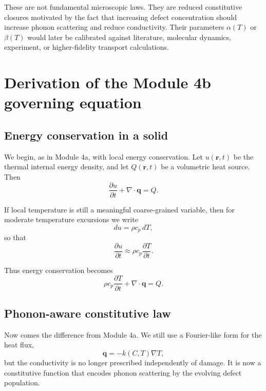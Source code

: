 \documentclass[11pt]{article}
\newcommand{\qvec}{\mathbf{q}}
\newcommand{\rvec}{\mathbf{r}}
\begin{document}
These are not fundamental microscopic laws. They are reduced constitutive closures motivated by the fact that increasing defect concentration should increase phonon scattering and reduce conductivity. Their parameters $\alpha(T)$ or $\beta(T)$ would later be calibrated against literature, molecular dynamics, experiment, or higher-fidelity transport calculations.

\section{Derivation of the Module 4b governing equation}

\subsection{Energy conservation in a solid}

We begin, as in Module 4a, with local energy conservation. Let $u(\rvec,t)$ be the thermal internal energy density, and let $Q(\rvec,t)$ be a volumetric heat source. Then
\begin{equation}
 \frac{\partial u}{\partial t} + \nabla\cdot \qvec = Q.
\end{equation}

If local temperature is still a meaningful coarse-grained variable, then for moderate temperature excursions we write
\begin{equation}
 du = \rho c_p \, dT,
\end{equation}
so that
\begin{equation}
 \frac{\partial u}{\partial t} \approx \rho c_p \frac{\partial T}{\partial t}.
\end{equation}

Thus energy conservation becomes
\begin{equation}
 \rho c_p \frac{\partial T}{\partial t} + \nabla\cdot \qvec = Q.
\end{equation}

\subsection{Phonon-aware constitutive law}

Now comes the difference from Module 4a. We still use a Fourier-like form for the heat flux,
\begin{equation}
 \qvec = -k(C,T)\nabla T,
\end{equation}
but the conductivity is no longer prescribed independently of damage. It is now a constitutive function that encodes phonon scattering by the evolving defect population.
\end{document}
